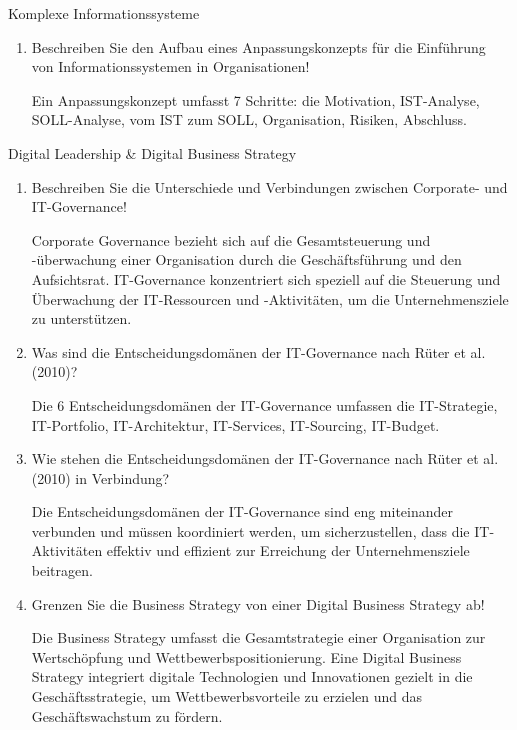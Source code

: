 \documentclass{article}
\begin{document}
\begin{exercise}{Komplexe Informationssysteme}
\begin{enumerate}
    \item Beschreiben Sie den Aufbau eines Anpassungskonzepts für die Einführung von Informationssystemen in Organisationen!
          \begin{solution}
            Ein Anpassungskonzept umfasst 7 Schritte: die Motivation, IST-Analyse, SOLL-Analyse, vom IST zum SOLL, Organisation, Risiken, Abschluss.
          \end{solution}
  \end{enumerate}
\end{exercise}

\begin{exercise}{Digital Leadership \& Digital Business Strategy}
  \begin{enumerate}
    \item Beschreiben Sie die Unterschiede und Verbindungen zwischen Corporate- und IT-Governance!
          \begin{solution}
            Corporate Governance bezieht sich auf die Gesamtsteuerung und -überwachung einer Organisation durch die Geschäftsführung und den Aufsichtsrat. IT-Governance konzentriert sich speziell auf die Steuerung und Überwachung der IT-Ressourcen und -Aktivitäten, um die Unternehmensziele zu unterstützen.
          \end{solution}

    \item Was sind die Entscheidungsdomänen der IT-Governance nach Rüter et al. (2010)?
          \begin{solution}
            Die 6 Entscheidungsdomänen der IT-Governance umfassen die IT-Strategie, IT-Portfolio, IT-Architektur, IT-Services, IT-Sourcing, IT-Budget.
          \end{solution}

    \item Wie stehen die Entscheidungsdomänen der IT-Governance nach Rüter et al. (2010) in Verbindung?
          \begin{solution}
            Die Entscheidungsdomänen der IT-Governance sind eng miteinander verbunden und müssen koordiniert werden, um sicherzustellen, dass die IT-Aktivitäten effektiv und effizient zur Erreichung der Unternehmensziele beitragen.
          \end{solution}

    \item Grenzen Sie die Business Strategy von einer Digital Business Strategy ab!
          \begin{solution}
            Die Business Strategy umfasst die Gesamtstrategie einer Organisation zur Wertschöpfung und Wettbewerbspositionierung. Eine Digital Business Strategy integriert digitale Technologien und Innovationen gezielt in die Geschäftsstrategie, um Wettbewerbsvorteile zu erzielen und das Geschäftswachstum zu fördern.
          \end{solution}


\end{enumerate}
\end{exercise}
\end{document}
